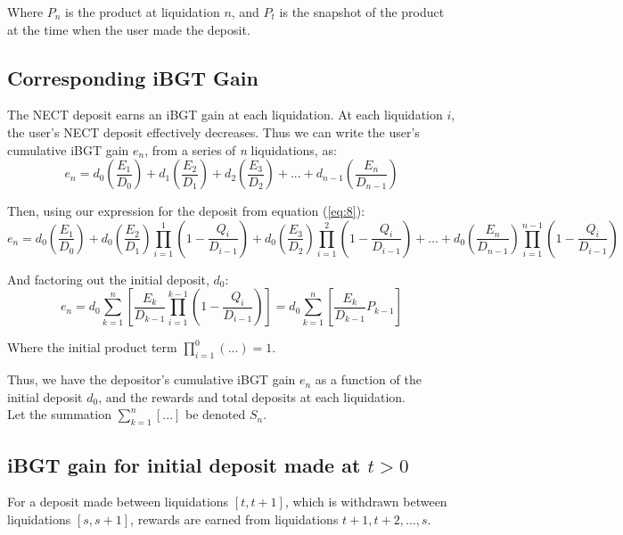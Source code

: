 \documentclass[reqno]{article}
\begin{document}
\bigskip
Where $P_n$ is the product at liquidation $n$, and $P_t$ is the snapshot of the product at the time when the user made the deposit.

\bigskip
\subsection{Corresponding iBGT Gain}

\bigskip
The NECT deposit earns an iBGT gain at each liquidation.
At each liquidation $i$, the user’s NECT deposit effectively decreases. Thus we can write the
user’s cumulative iBGT gain $e_{n}$, from a series of \textit{n} liquidations, as:
\begin{equation} 
e_n=d_0\left(\frac{E_1}{D_0}\right)+d_1\left(\frac{E_2}{D_1}\right)+d_2\left(\frac{E_3}{D_2}\right)+...+d_{n-1}\left(\frac{E_n}{D_{n-1}}\right)
\end{equation}

\bigskip
Then, using our expression for the deposit from equation (\ref{eq:8}):
\begin{equation} 
e_n=d_0\left(\frac{E_1}{D_0}\right)+d_0\left(\frac{E_2}{D_1}\right)\prod^1_{i=1}\left(1-\frac{Q_i}{D_{i-1}}\right)+d_0\left(\frac{E_3}{D_2}\right)\prod^2_{i=1}\left(1-\frac{Q_i}{D_{i-1}}\right)+...+d_0\left(\frac{E_n}{D_{n-1}}\right)\prod^{n-1}_{i=1}\left(1-\frac{Q_i}{D_{i-1}}\right)
\end{equation}

\bigskip
And factoring out the initial deposit, $d_0$:
\begin{equation} \label{eq:13}
    e_n=d_0\sum^n_{k=1}\left[\frac{E_k}{D_{k-1}}\prod^{k-1}_{i=1}\left(1-\frac{Q_i}{D_{i-1}}\right)\right] = d_0\sum^n_{k=1}\left[\frac{E_k}{D_{k-1}}P_{k-1}\right]
\end{equation}

\bigskip
Where the initial product term $\displaystyle\prod^0_{i=1}(...)=1$.

\bigskip
Thus, we have the depositor's cumulative iBGT gain $e_n$ as a function of the initial deposit $d_0$, and the rewards and total deposits at each liquidation.\\
Let the summation $\displaystyle\sum^n_{k=1}[...]$ be denoted $S_n$.

\bigskip
\subsection{iBGT gain for initial deposit made at $t>0$}

\bigskip
For a deposit made between liquidations $[t, t+1]$, which is withdrawn between liquidations $[s, s+1]$, rewards are earned from liquidations $t+1, t+2, \ldots, s$.
\end{document}
